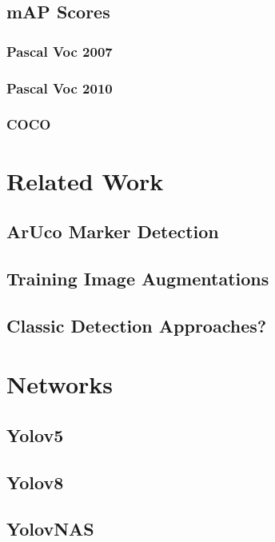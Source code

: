 \documentclass[10pt]{book}
\begin{document}
\section{mAP Scores}

\subsection{Pascal Voc 2007}

\subsection{Pascal Voc 2010}

\subsection{COCO}

\chapter{Related Work}
\label{chap:relatedw}

\section{ArUco Marker Detection}

\section{Training Image Augmentations}

\section{Classic Detection Approaches?}

\chapter{Networks}
\label{chap:netw}

\section{Yolov5}

\section{Yolov8}

\section{YolovNAS}
\end{document}
